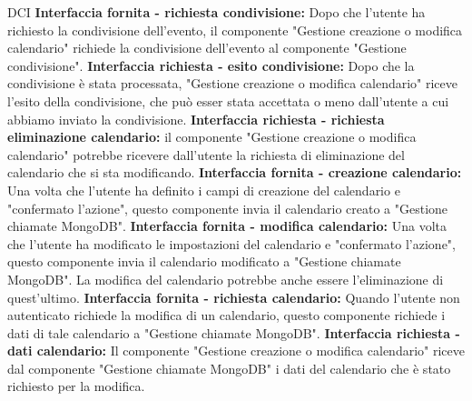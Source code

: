 \begin{listaPersonale}{DCI}
    \textbf{Interfaccia fornita - richiesta condivisione:} Dopo che l'utente ha richiesto la condivisione dell'evento, il componente "Gestione creazione o modifica calendario" richiede la condivisione dell'evento al componente "Gestione condivisione".
    \textbf{Interfaccia richiesta - esito condivisione:} Dopo che la condivisione è stata processata, "Gestione creazione o modifica calendario" riceve l'esito della condivisione, che può esser stata accettata o meno dall'utente a cui abbiamo inviato la condivisione.
    \textbf{Interfaccia richiesta - richiesta eliminazione calendario:} il componente "Gestione creazione o modifica calendario" potrebbe ricevere dall'utente la richiesta di eliminazione del calendario che si sta modificando.
    \textbf{Interfaccia fornita - creazione calendario: } Una volta che l'utente ha definito i campi di creazione del calendario e "confermato l'azione", questo componente invia il calendario creato a "Gestione chiamate MongoDB".
    \textbf{Interfaccia fornita - modifica calendario: } Una volta che l'utente ha modificato le impostazioni del calendario e "confermato l'azione", questo componente invia il calendario modificato a "Gestione chiamate MongoDB". La modifica del calendario potrebbe anche essere l'eliminazione di quest'ultimo.
    \textbf{Interfaccia fornita - richiesta calendario: } Quando l'utente non autenticato richiede la modifica di un calendario, questo componente richiede i dati di tale calendario a "Gestione chiamate MongoDB".
    \textbf{Interfaccia richiesta - dati calendario: } Il componente "Gestione creazione o modifica calendario" riceve dal componente "Gestione chiamate MongoDB" i dati del calendario che è stato richiesto per la modifica.



\end{listaPersonale}
